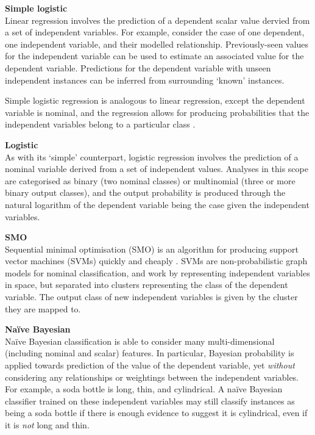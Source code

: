\textbf{Simple logistic}\\
Linear regression involves the prediction of a dependent scalar value dervied from a set of independent variables. For example, consider the case of one dependent, one independent variable, and their modelled relationship. Previously-seen values for the independent variable can be used to estimate an associated value for the dependent variable. Predictions for the dependent variable with unseen independent instances can be inferred from surrounding `known' instances.

Simple logistic regression is analogous to linear regression, except the dependent variable is nominal, and the regression allows for producing probabilities that the independent variables belong to a particular class \cite{sumner05}.

\textbf{Logistic}\\
As with its `simple' counterpart, logistic regression involves the prediction of a nominal variable derived from a set of independent values. Analyses in this scope are categorised as binary (two nominal classes) or multinomial (three or more binary output classes), and the output probability is produced through the natural logarithm of the dependent variable being the case given the independent variables.

\textbf{SMO}\\
Sequential minimal optimisation (SMO) is an algorithm for producing support vector machines (SVMs) quickly and cheaply \cite{platt98}. SVMs are non-probabilistic graph models for nominal classification, and work by representing independent variables in space, but separated into clusters representing the class of the dependent variable. The output class of new independent variables is given by the cluster they are mapped to.

\textbf{Na\"{i}ve Bayesian}\\
Na\"{i}ve Bayesian classification is able to consider many multi-dimensional (including nominal and scalar) features. In particular, Bayesian probability is applied towards prediction of the value of the dependent variable, yet \textit{without} considering any relationships or weightings between the independent variables. For example, a soda bottle is long, thin, and cylindrical. A na\"{i}ve Bayesian classifier trained on these independent variables may still classify instances as being a soda bottle if there is enough evidence to suggest it is cylindrical, even if it is \textit{not} long and thin.

